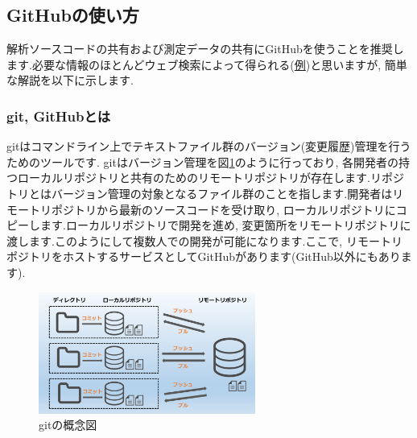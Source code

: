 \subsection{GitHubの使い方}
解析ソースコードの共有および測定データの共有にGitHubを使うことを推奨します.必要な情報のほとんどウェブ検索によって得られる(\href{https://tech-blog.rakus.co.jp/entry/20200529/git}{例})と思いますが, 簡単な解説を以下に示します.

\subsubsection{git, GitHubとは}
gitはコマンドライン上でテキストファイル群のバージョン(変更履歴)管理を行うためのツールです.
gitはバージョン管理を図\ref{fig:git_desc}のように行っており, 各開発者の持つローカルリポジトリと共有のためのリモートリポジトリが存在します\cite{github}.リポジトリとはバージョン管理の対象となるファイル群のことを指します.開発者はリモートリポジトリから最新のソースコードを受け取り, ローカルリポジトリにコピーします.ローカルリポジトリで開発を進め, 変更箇所をリモートリポジトリに渡します.このようにして複数人での開発が可能になります.ここで, リモートリポジトリをホストするサービスとしてGitHubがあります(GitHub以外にもあります).
\begin{figure}
    \centering
    \includegraphics[height=4cm]{git_desc.png}
    \caption{gitの概念図\cite{github}}
    \label{fig:git_desc}
\end{figure}

